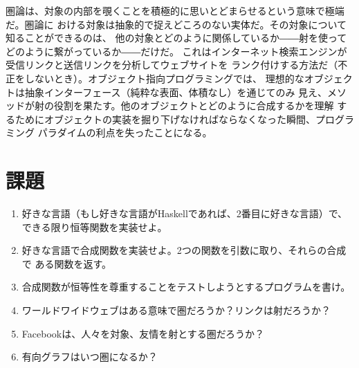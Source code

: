 圏論は、対象の内部を覗くことを積極的に思いとどまらせるという意味で極端だ。圏論に
おける対象は抽象的で捉えどころのない実体だ。その対象について知ることができるのは、
他の対象とどのように関係しているか――射を使ってどのように繋がっているか――だけだ。
これはインターネット検索エンジンが受信リンクと送信リンクを分析してウェブサイトを
ランク付けする方法だ（不正をしないとき）。オブジェクト指向プログラミングでは、
理想的なオブジェクトは抽象インターフェース（純粋な表面、体積なし）を通じてのみ
見え、メソッドが射の役割を果たす。他のオブジェクトとどのように合成するかを理解
するためにオブジェクトの実装を掘り下げなければならなくなった瞬間、プログラミング
パラダイムの利点を失ったことになる。

\section{課題}

\begin{enumerate}
  \tightlist
  \item
        好きな言語（もし好きな言語がHaskellであれば、2番目に好きな言語）で、
        できる限り恒等関数を実装せよ。
  \item
        好きな言語で合成関数を実装せよ。2つの関数を引数に取り、それらの合成で
        ある関数を返す。
  \item
        合成関数が恒等性を尊重することをテストしようとするプログラムを書け。
  \item
        ワールドワイドウェブはある意味で圏だろうか？リンクは射だろうか？
  \item
        Facebookは、人々を対象、友情を射とする圏だろうか？
  \item
        有向グラフはいつ圏になるか？
\end{enumerate}
